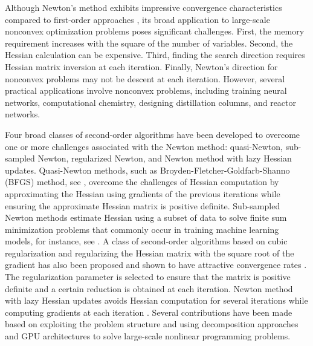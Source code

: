 \documentclass{elsarticle}
\numberwithin{equation}{section}
\begin{document}
Although Newton's method exhibits impressive convergence characteristics compared to first-order approaches \cite{ karimireddy2018global, nocedal1999numerical}, its broad application to large-scale nonconvex optimization problems poses significant challenges. First, the memory requirement increases with the square of the number of variables. Second, the Hessian calculation can be expensive. Third, finding the search direction requires Hessian matrix inversion at each iteration. Finally, Newton's direction for nonconvex problems may not be descent at each iteration. However, several practical applications involve nonconvex problems, including training neural networks, computational chemistry, designing distillation columns, and reactor networks. 

Four broad classes of second-order algorithms have been developed to overcome one or more challenges associated with the Newton method: quasi-Newton, sub-sampled Newton, regularized Newton, and Newton method with lazy Hessian updates. Quasi-Newton methods, such as Broyden-Fletcher-Goldfarb-Shanno (BFGS) method, see \cite{Broyden1970TheCO,Fletcher1970ANA,Goldfarb1970AFO,Shanno1970ConditioningOQ}, overcome the challenges of Hessian computation by approximating the Hessian using gradients of the previous iterations while ensuring the approximate Hessian matrix is positive definite. Sub-sampled Newton methods estimate Hessian using a subset of data to solve finite sum minimization problems that commonly occur in training machine learning models, for instance, see \cite{bollapragada2016exactinexactsubsamplednewton, erdogdu2015convergence,roosta2019sub}. A class of second-order algorithms based on cubic regularization \cite{nesterov2006cubic} and regularizing the Hessian matrix with the square root of the gradient has also been proposed \cite{gratton2025yet} and shown to have attractive convergence rates \cite{cartis2010complexity}. The regularization parameter is selected to ensure that the matrix is positive definite and a certain reduction is obtained at each iteration. Newton method with lazy Hessian updates avoids Hessian computation for several iterations while computing gradients at each iteration \cite{doikov2023second}. 
Several contributions have been made based on exploiting the problem structure \cite{allman2019decode, mitrai2021efficient} and using decomposition approaches \cite{chiang2014structured, kang2014interior, li2019generalized} and GPU architectures \cite{pacaud2024parallel, montoison2025madncl} to solve large-scale nonlinear programming problems. 
\end{document}

